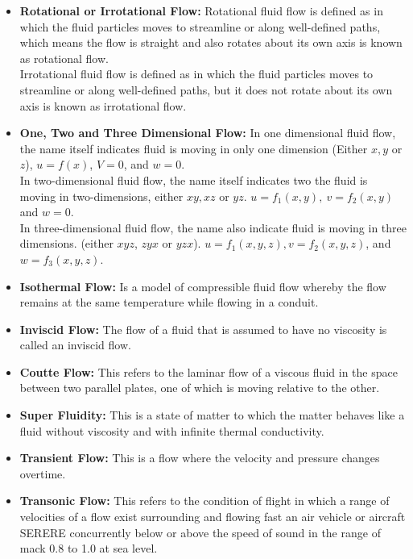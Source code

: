 \documentclass[11pt]{report}
\newcommand{\sps}{\\[0.2cm]}
\newcommand{\bt}[1]{\textbf{#1}}
\begin{document}
\begin{itemize}[label=--]
		\item\bt{Rotational or Irrotational Flow:} Rotational fluid flow is defined as in which the fluid particles moves to streamline or along well-defined paths, which means the flow is straight and also rotates about its own axis is known as rotational flow.\sps
		Irrotational fluid flow is defined as in which the fluid particles moves to streamline or along well-defined paths, but it does not rotate about its own axis is known as irrotational flow.
		
		\item\bt{One, Two and Three Dimensional Flow:} In one dimensional fluid flow, the name itself indicates fluid is moving in only one dimension (Either $x,y$ or $z$), $u=f(x)$, $V=0$, and $w=0$.\sps
		In two-dimensional fluid flow, the name itself indicates two the fluid is moving in two-dimensions, either $xy, xz$ or $yz$. $u=f_1(x,y),~ v=f_2(x,y)$ and $w=0$.\sps
		In three-dimensional fluid flow, the name also indicate fluid is moving in three dimensions. (either $xyz$, $zyx$ or $yzx$). $u=f_1(x,y,z), v=f_2(x,y,z)$, and $w=f_3(x,y,z)$.
		
		\item \bt{Isothermal Flow:} Is a model of compressible fluid flow whereby the flow remains at the same temperature while flowing in a conduit.
		
		\item\bt{Inviscid Flow:} The flow of a fluid that is assumed to have no viscosity is called an inviscid flow.
		
		\item\bt{Coutte Flow:} This refers to the laminar flow of a viscous fluid in the space between two parallel plates, one of which is moving relative to the other.
		
		\item\bt{Super Fluidity:} This is a state of matter to which the matter behaves like a fluid without viscosity and with infinite thermal conductivity.
		
		\item\bt{Transient Flow:} This is a flow where the velocity and pressure changes overtime.
		
		\item\bt{Transonic Flow:} This refers to the condition of flight in which a range of velocities of a flow exist surrounding and flowing fast an air vehicle or aircraft SERERE concurrently below or above the speed of sound in the range of mack 0.8 to 1.0 at sea level.
	\end{itemize}
	
\end{document}
